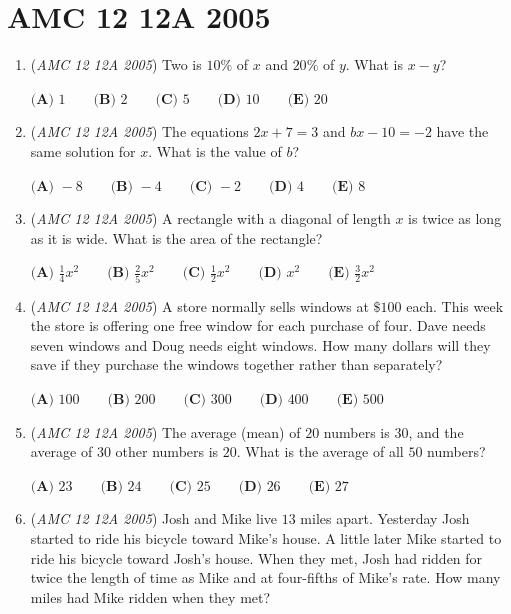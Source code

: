 \section{AMC 12 12A 2005}
        \begin{enumerate}
        	\item (\textit{AMC 12 12A 2005}) Two is $10 \%$ of $x$ and $20 \%$ of $y$. What is $x - y$?


 $\textbf{(A) } 1 \qquad \textbf{(B) } 2 \qquad \textbf{(C) } 5 \qquad \textbf{(D) } 10 \qquad \textbf{(E) } 20$


	\item (\textit{AMC 12 12A 2005}) The equations $2x + 7 = 3$ and $bx - 10 = - 2$ have the same solution for $x$. What is the value of $b$?


 $\textbf{(A) } -8 \qquad \textbf{(B) } -4 \qquad \textbf{(C) } -2 \qquad \textbf{(D) } 4 \qquad \textbf{(E) } 8$


	\item (\textit{AMC 12 12A 2005}) A rectangle with a diagonal of length $x$ is twice as long as it is wide. What is the area of the rectangle?


 $\textbf{(A) } \frac{1}{4}x^2 \qquad \textbf{(B) } \frac{2}{5}x^2 \qquad \textbf{(C) } \frac{1}{2}x^2 \qquad \textbf{(D) } x^2 \qquad \textbf{(E) } \frac{3}{2}x^2$


	\item (\textit{AMC 12 12A 2005}) A store normally sells windows at $\$100$ each. This week the store is offering one free window for each purchase of four. Dave needs seven windows and Doug needs eight windows. How many dollars will they save if they purchase the windows together rather than separately?


 $\textbf{(A) } 100 \qquad \textbf{(B) } 200 \qquad \textbf{(C) } 300 \qquad \textbf{(D) } 400 \qquad \textbf{(E) } 500$


	\item (\textit{AMC 12 12A 2005}) The average (mean) of $20$ numbers is $30$, and the average of $30$ other numbers is $20$. What is the average of all $50$ numbers?


 $\textbf{(A) } 23 \qquad \textbf{(B) } 24 \qquad \textbf{(C) } 25 \qquad \textbf{(D) } 26 \qquad \textbf{(E) } 27$


	\item (\textit{AMC 12 12A 2005}) Josh and Mike live $13$ miles apart. Yesterday Josh started to ride his bicycle toward Mike's house. A little later Mike started to ride his bicycle toward Josh's house. When they met, Josh had ridden for twice the length of time as Mike and at four-fifths of Mike's rate. How many miles had Mike ridden when they met?



\end{enumerate}
